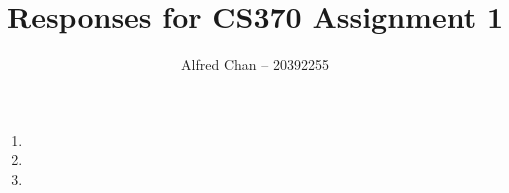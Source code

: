 \documentclass[12pt]{article}
\title{Responses for CS370 Assignment 1}
\author{Alfred Chan -- 20392255}
\begin{document}
\maketitle

\begin{enumerate}
\item
\item
\item

\end{enumerate}
\end{document}

